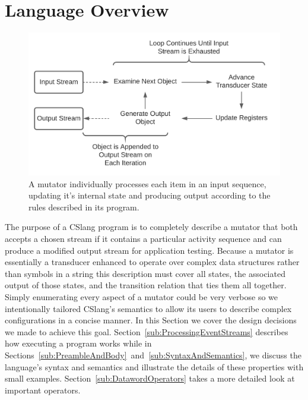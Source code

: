 \section{Language Overview}
\label{sec:Overview}

\begin{figure}[h]
  \centering
  \includegraphics[scale=.6]{images/processing}
  \caption{A mutator individually processes each item in an input
  sequence, updating it's internal state and producing output according
  to the rules described in its program.}
  \label{fig:Processing}
\end{figure}

The purpose
of a CSlang program is to completely describe a mutator
that both
accepts a chosen stream if it contains a particular
activity sequence and can produce a modified
output stream
for application testing.
Because a mutator is essentially a
transducer enhanced to operate over complex data structures
rather than symbols in a string
this description must cover all states,
the associated output of those states,
and the transition
relation that ties them all together.
Simply enumerating every aspect of a mutator could be very verbose
so we intentionally tailored CSlang's semantics to allow its users to
describe complex configurations in a concise manner.
In this Section we cover the design decisions we made
to achieve this goal.
Section~\ref{sub:ProcessingEventStreams} describes how executing a program works
while
in Sections~\ref{sub:PreambleAndBody}~and~\ref{sub:SyntaxAndSemantics},
we discuss the
language's syntax and semantics and illustrate the details
of these properties
with small examples.
Section~\ref{sub:DatawordOperators} takes a more
detailed look at important operators.

